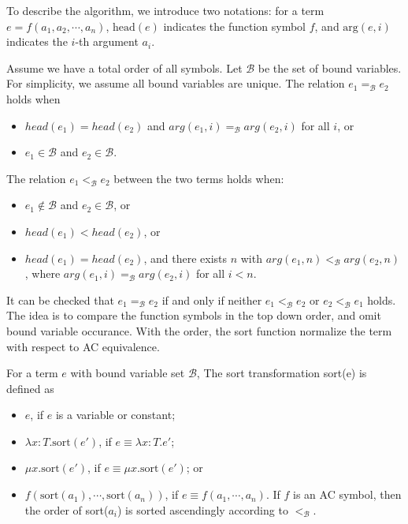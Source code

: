 \documentclass[runningheads]{llncs}
\begin{document}
To describe the algorithm, we introduce two notations: for a term $e = f(a_1, a_2, \cdots, a_n)$, $\textrm{head}(e)$ indicates the function symbol $f$,
and $\textrm{arg}(e, i)$ indicates the $i$-th argument $a_i$. 
\begin{definition}
    Assume we have a total order of all symbols.
    Let $\mathcal{B}$ be the set of bound variables.
    For simplicity, we assume all bound variables are unique.
    The relation $e_1 =_\mathcal{B} e_2$ holds when
    \begin{itemize}
        \item $head(e_1) = head(e_2)$ and $arg(e_1, i) =_\mathcal{B} arg(e_2, i)$ for all $i$, or
        \item $e_1 \in \mathcal{B}$ and $e_2 \in \mathcal{B}$.
    \end{itemize} 

    The relation $e_1 <_\mathcal{B} e_2$ between the two terms holds when:
    \begin{itemize}
        \item $e_1 \notin \mathcal{B}$ and $e_2 \in \mathcal{B}$, or
        \item $head(e_1) < head(e_2)$, or
        \item $head(e_1) = head(e_2)$, and there exists $n$ with $arg(e_1, n) <_\mathcal{B} arg(e_2, n)$, where $arg(e_1, i) =_\mathcal{B} arg(e_2, i)$ for all $i < n$.
    \end{itemize}
\end{definition}
It can be checked that $e_1 =_\mathcal{B} e_2$ if and only if neither $e_1 <_\mathcal{B} e_2$ or $e_2 <_\mathcal{B} e_1$ holds.
The idea is to compare the function symbols in the top down order, and omit bound variable occurance. 
With the order, the sort function normalize the term with respect to AC equivalence.

\begin{definition}
    For a term $e$ with bound variable set $\mathcal{B}$,
    The sort transformation sort(e) is defined as
    \begin{itemize}
        \item $e$, if $e$ is a variable or constant;
        \item $\lambda x:T. \textrm{sort}(e')$, if $e \equiv \lambda x : T. e'$;
        \item $\mu x. \textrm{sort}(e')$, if $e \equiv \mu x. \textrm{sort}(e')$; or
        \item $f(\textrm{sort}(a_1), \cdots, \textrm{sort}(a_n))$, if $e \equiv f(a_1, \cdots, a_n)$. If $f$ is an AC symbol, then the order of sort($a_i$) is sorted ascendingly according to $<_\mathcal{B}$.
    \end{itemize}
\end{definition}
\end{document}
